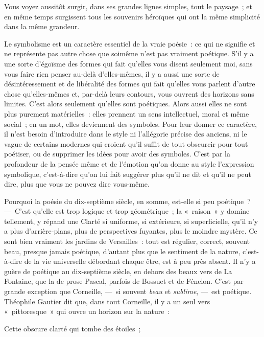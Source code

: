 \documentclass[french,twoside]{book} %
\begin{document}
\noindent Vous voyez aussitôt surgir, dans ses grandes lignes simples, tout le paysage ; et en même temps surgissent tous les souvenirs héroïques qui ont la même simplicité dans la même grandeur.\par
Le symbolisme est un caractère essentiel de la vraie poésie : ce qui ne signifie et ne représente pas autre chose que soimême n’est pas vraiment poétique. S’il y a une sorte d’égoïsme des formes qui fait qu’elles vous disent seulement moi, sans vous faire rien penser au-delà d’elles-mêmes, il y a aussi une sorte de désintéressement et de libéralité des formes qui fait qu’elles vous parlent d’autre chose qu’elles-mêmes et, par-delà leurs contours, vous ouvrent des horizons sans limites. C’est alors seulement qu’elles sont poétiques. Alors aussi elles ne sont plus purement matérielles : elles prennent un sens intellectuel, moral et même social ; en un mot, elles deviennent des symboles. Pour leur donner ce caractère, il n’est besoin d’introduire dans le style ni l’allégorie précise des anciens, ni le vague de certains modernes qui croient qu’il suffit de tout obscurcir pour tout poétiser, ou de supprimer les idées pour avoir des symboles. C’est par la profondeur de la pensée même et de l’émotion qu’on donne au style l’expression symbolique, c’est-à-dire qu’on lui fait suggérer plus qu’il ne dit et qu’il ne peut dire, plus que vous ne pouvez dire vous-même.\par
Pourquoi la poésie du dix-septième siècle, en somme, est-elle si peu poétique ? — C’est qu’elle est trop logique et trop géométrique ; la « raison » y domine tellement, y répand une Clarté si uniforme, si extérieure, si superficielle, qu’il n’y a plus d’arrière-plans, plus de perspectives fuyantes, plus le moindre mystère. Ce sont bien vraiment les jardins de Versailles : tout est régulier, correct, souvent beau, presque jamais poétique, d’autant plus que le sentiment de la nature, c’est-à-dire de la vie universelle débordant chaque être, est à peu près absent. Il n’y a guère de poétique au dix-septième siècle, en dehors des beaux vers de La Fontaine, que la de prose Pascal, parfois de Bossuet et de Fénelon. C’est par grande exception que Corneille, — si souvent \emph{beau} et \emph{sublime}, — est poétique. Théophile Gautier dit que, dans tout Corneille, il y a un seul vers « pittoresque » qui ouvre un horizon sur la nature :\par

Cette obscure clarté qui tombe des étoiles ;\\
\end{document}
